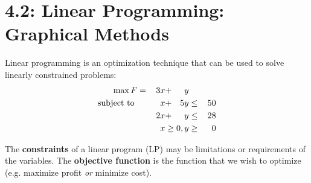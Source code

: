 \documentclass[../mathNotesPreamble]{subfiles}
\begin{document}
  \section{4.2: Linear Programming: Graphical Methods}
    \begin{defn*}
      Linear programming is an optimization technique that can be used to solve linearly constrained problems:
      \begin{alignat*}{4}
        \max F&=&\,3x&+&y\\
        \textnormal{subject to }&& x&+&5y&\leq &\,50\\
          &&2x&+&y&\leq& 28\\
          &&&&\mathllap{x\geq 0}, y&\geq& 0
      \end{alignat*}

      The \textbf{constraints} of a linear program (LP) may be limitations or requirements of the variables. The \textbf{objective function} is the function that we wish to optimize (e.g. maximize profit \emph{or} minimize cost).
    \end{defn*}
\end{document}
